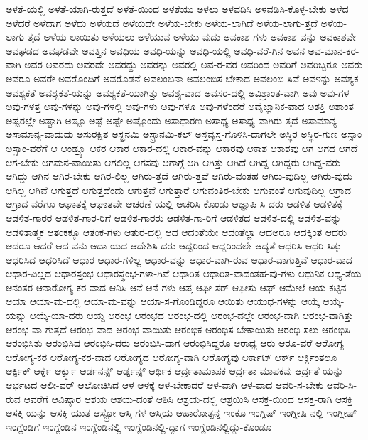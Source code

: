 {ಅಳತೆ-ಯಲ್ಲಿ
ಅಳತೆ-ಯಾಗಿ-ರುತ್ತದೆ
ಅಳತೆ-ಯಿಂದ
ಅಳತೆಯು
ಅಳಲು
ಅಳವಡಿಸಿ
ಅಳವಡಿಸಿ-ಕೊಳ್ಳ-ಬೇಕು
ಅಳೆದ
ಅಳೆದರೆ
ಅಳೆದಾಗ
ಅಳೆದು
ಅಳೆಯದೆ
ಅಳೆಯದೇ
ಅಳೆಯ-ಬೇಕು
ಅಳೆಯ-ಲಾಗಿದೆ
ಅಳೆಯ-ಲಾಗು-ತ್ತದೆ
ಅಳೆಯ-ಲಾಗು-ತ್ತದೆ
ಅಳೆಯ-ಲಾಯಿತು
ಅಳೆಯಲು
ಅಳೆಯುವ
ಅಳೆಯು-ವುದು
ಅವಕಾಶ-ಗಳು
ಅವಕಾಶ-ವನ್ನು
ಅವಕಾಶವೇ
ಅವಘಡದ
ಅವಘಡವೇ
ಅವತ್ತಿನ
ಅವಧಿಯ
ಅವಧಿ-ಯನ್ನು
ಅವಧಿ-ಯಲ್ಲಿ
ಅವಧಿ-ವರೆ-ಗಿನ
ಅವನ
ಅವ-ಮಾನ-ಕರ-ವಾಗಿ
ಅವರ
ಅವರದು
ಅವರದೇ
ಅವರದ್ದು
ಅವರನ್ನು
ಅವರಲ್ಲಿ
ಅವ-ರ-ವರ
ಅವರಿಂದ
ಅವರಿಗೆ
ಅವರಿಬ್ಬರೂ
ಅವರು
ಅವರೂ
ಅವರೇ
ಅವರೊಂದಿಗೆ
ಅವರೊಡನೆ
ಅವಲಂಬನಾ
ಅವಲಂಬಿಸ-ಬೇಕಾದ
ಅವಲಂಬಿ-ಸಿವೆ
ಅವಳನ್ನು
ಅವಶ್ಯಕ
ಅವಶ್ಯಕತೆ
ಅವಶ್ಯಕತೆ-ಯನ್ನು
ಅವಶ್ಯಕತೆ-ಯಾಗಿತ್ತು
ಅವಶ್ಯ-ವಾದ
ಅವಸರ-ದಲ್ಲಿ
ಅವಿಶ್ರಾಂತ-ವಾಗಿ
ಅವು
ಅವು-ಗಳ
ಅವು-ಗಳತ್ತ
ಅವು-ಗಳನ್ನು
ಅವು-ಗಳಲ್ಲಿ
ಅವು-ಗಳು
ಅವು-ಗಳೂ
ಅವು-ಗಳೆಂದರೆ
ಅವೈಜ್ಞಾನಿಕ-ವಾದ
ಅಶಕ್ತಿ
ಅಶಾಂತ
ಅಷ್ಟರಲ್ಲೇ
ಅಷ್ಟಾಗಿ
ಅಷ್ಟೂ
ಅಷ್ಟೆ
ಅಷ್ಟೇ
ಅಷ್ಟೊಂದು
ಅಸಾಧಾರಣ
ಅಸಾಧ್ಯ
ಅಸಾಧ್ಯ-ವಾಗಿರು-ತ್ತದೆ
ಅಸಾಮಾನ್ಯ
ಅಸಾಮಾನ್ಯ-ವಾದುದು
ಅಸುರಕ್ಷಿತ
ಅಸ್ಟ್ರನಮಿ
ಅಸ್ಟ್ರಾನಮಿ-ಕಲ್
ಅಸ್ತವ್ಯಸ್ತ-ಗೊಳಿಸಿ-ದಾಗಲೇ
ಅಸ್ಥಿರ
ಅಸ್ಥಿರ-ಗುಣ
ಅಸ್ಸಾಂ
ಅಸ್ಸಾಂ-ವರೆಗೆ
ಆ
ಆಂಡ್ರ್ಯೂ
ಆಕರ
ಆಕಾರ
ಆಕಾರ-ದಲ್ಲಿ
ಆಕಾರ-ವನ್ನು
ಆಕಾರವು
ಆಕಾಶ
ಆಕಾಶವು
ಆಗ
ಆಗದ
ಆಗದೆ
ಆಗ-ಬೇಕು
ಆಗಮನ-ವಾಯಿತು
ಆಗಲಿಲ್ಲ
ಆಗಸವು
ಆಗಾಗ್ಗೆ
ಆಗಿ
ಆಗಿತ್ತು
ಆಗಿದೆ
ಆಗಿದ್ದ
ಆಗಿದ್ದರು
ಆಗಿದ್ದ-ವರು
ಆಗಿದ್ದು
ಆಗಿನ
ಆಗಿರ-ಬೇಕು
ಆಗಿರ-ಲಿಲ್ಲ
ಆಗಿರು-ತ್ತದೆ
ಆಗಿರು-ತ್ತವೆ
ಆಗಿರು-ವಂತಹ
ಆಗಿರು-ವುದಿಲ್ಲ
ಆಗಿರು-ವುದು
ಆಗಿಲ್ಲ
ಆಗಿವೆ
ಆಗುತ್ತದೆ
ಆಗುತ್ತದೆಂದು
ಆಗುತ್ತವೆ
ಆಗುತ್ತಾರೆ
ಆಗುವಂತಿರ-ಬೇಕು
ಆಗುವಂತೆ
ಆಗುವುದಿಲ್ಲ
ಆಗ್ರಾದ
ಆಗ್ರಾದ-ವರೆಗೂ
ಆಘಾತಕ್ಕೆ
ಆಘಾತವೇ
ಆಚರಣೆ-ಯಲ್ಲಿ
ಆಚರಿಸಿ-ಕೊಂಡು
ಆಜ್ಞಾಪಿ-ಸಿ-ದರು
ಆಡಳಿತ
ಆಡಳಿತಕ್ಕೆ
ಆಡಳಿತ-ಗಾರರ
ಆಡಳಿತ-ಗಾರ-ರಿಗೆ
ಆಡಳಿತ-ಗಾರರು
ಆಡಳಿತ-ಗಾ-ರಿಗೆ
ಆಡಳಿತದ
ಆಡಳಿತ-ದಲ್ಲಿ
ಆಡಳಿತ-ವನ್ನು
ಆಡಳಿತಾತ್ಮಕ
ಆತಂಕಕ್ಕೂ
ಆತಂಕ-ಗಳು
ಆತುರ-ದಲ್ಲಿ
ಆದ
ಆದಂತೆಯೇ
ಆದಂತೆಲ್ಲಾ
ಆದಅರೂ
ಆದಕ್ಕಿಂತ
ಆದರು
ಆದರೂ
ಆದರೆ
ಆದ-ವನು
ಆದಾ-ಯದ
ಆದೇಶಿಸಿ-ದರು
ಆದ್ದರಿಂದ
ಆದ್ದರಿಂದಲೇ
ಆದ್ಯತೆ
ಆಧರಿಸಿ
ಆಧರಿ-ಸಿತ್ತು
ಆಧರಿಸಿದ
ಆಧರಿಸಿದೆ
ಆಧಾರ
ಆಧಾರ-ಗಳಿಲ್ಲ
ಆಧಾರ-ವನ್ನು
ಆಧಾರ-ವಾಗಿ-ರುವ
ಆಧಾರ-ವಾಗುತ್ತಿವೆ
ಆಧಾರ-ವಾದ
ಆಧಾರ-ವಿಲ್ಲದ
ಆಧಾರಸ್ತಂಭ
ಆಧಾರಸ್ಥಂಭ-ಗಳಾ-ಗಿವೆ
ಆಧಾರಿತ
ಆಧಾರಿತ-ವಾದಂತಹ-ವು-ಗಳು
ಆಧುನಿಕ
ಆಧ್ಯ-ತೆಯ
ಆನಂತರ
ಆನಾರೋಗ್ಯ-ಕರ-ವಾದ
ಆನಿಸಿ
ಆನೆ
ಆನೆ-ಗಳು
ಆಪ್ತ
ಆಫೀ-ಸರ್
ಆಫೀಸು
ಆಫ್
ಆಮೇಲೆ
ಆಯ-ಕಟ್ಟಿನ
ಆಯಾ
ಆಯಾ-ಮ-ದಲ್ಲಿ
ಆಯಾ-ಮ-ವನ್ನು
ಆಯಾ-ಸ-ಗೊಂಡಿದ್ದರೂ
ಆಯಿತು
ಆಯುಧ-ಗಳನ್ನು
ಆಯ್ಕೆ
ಆಯ್ಕೆ-ಯನ್ನು
ಆಯ್ಕೆ-ಯಾ-ದರು
ಆಯ್ದ
ಆರಂಭ
ಆರಂಭದ
ಆರಂಭ-ದಲ್ಲಿ
ಆರಂಭ-ದಲ್ಲೇ
ಆರಂಭ-ವಾಗಿ
ಆರಂಭ-ವಾಗಿತ್ತು
ಆರಂಭ-ವಾ-ಗುತ್ತದೆ
ಆರಂಭ-ವಾದ
ಆರಂಭ-ವಾಯಿತು
ಆರಂಭಿಕ
ಆರಂಭಿಸ-ಬೇಕಾಯಿತು
ಆರಂಭಿ-ಸಲು
ಆರಂಭಿಸಿ
ಆರಂಭಿಸಿತು
ಆರಂಭಿಸಿದ
ಆರಂಭಿಸಿ-ದರು
ಆರಂಭಿಸಿ-ದಾಗ
ಆರಂಭಿಸಿದ್ದರೂ
ಆರಾಧ್ಯ
ಆರು
ಆರೂ-ವರೆ
ಆರೋಗ್ಯ
ಆರೋಗ್ಯ-ಕರ
ಆರೋಗ್ಯ-ಕರ-ವಾದ
ಆರೋಗ್ಯದ
ಆರೋಗ್ಯ-ವಾಗಿ
ಆರೋಗ್ಯವು
ಆರ್ಕಾಟ್
ಆರ್ಕ್
ಆರ್ಕ್ಗಿಂತಲೂ
ಆರ್ಕ್ಟಿಕ್
ಆರ್ಕ್ನ
ಆರ್ಕ್ನ್ನು
ಆರ್ಡನನ್ಸ್
ಆರ್ಡ್ನನ್ಸ್
ಆರ್ಥಿಕ
ಆರ್ದ್ರತಾಮಾಪಕ
ಆರ್ದ್ರತಾ-ಮಾಪಕವು
ಆರ್ದ್ರತೆ-ಯನ್ನು
ಆರ್ಭಟದ
ಆಲೀ-ವರ್
ಆಲೋಚಿಸಿದ
ಆಳ
ಆಳಕ್ಕೆ
ಆಳ-ಬೇಕಾದರೆ
ಆಳ-ವಾಗಿ
ಆಳ-ವಾದ
ಆವರಿ-ಸ-ಬೇಕು
ಆವರಿ-ಸಿ-ರುವ
ಆವರೆಗೆ
ಆವಿಷ್ಕಾರ
ಆಶಯ
ಆಶಯ-ದಂತೆ
ಆಶಿಸಿ
ಆಶ್ರಯ-ದಲ್ಲಿ
ಆಶ್ರಯಿಸಿ
ಆಸಕ್ತ-ಯಿಂದ
ಆಸಕ್ತ-ರಾಗಿ
ಆಸಕ್ತಿ
ಆಸಕ್ತಿ-ಯನ್ನು
ಆಸಕ್ತಿ-ಯುತ
ಆಸ್ಟ್ರೋ
ಆಸ್ತಿ-ಗಳ
ಆಸ್ತಿಯ
ಆಹಾರೋತ್ಪನ್ನ
ಇಂಕೂ
ಇಂಗ್ಲಿಷ್
ಇಂಗ್ಲೀಷಿ-ನಲ್ಲಿ
ಇಂಗ್ಲೀಷ್
ಇಂಗ್ಲೆಂಡಿಗೆ
ಇಂಗ್ಲೆಂಡಿನ
ಇಂಗ್ಲೆಂಡಿನಲ್ಲಿ
ಇಂಗ್ಲೆಂಡಿನಲ್ಲಿ-ದ್ದಾಗ
ಇಂಗ್ಲೆಂಡಿನಲ್ಲಿದ್ದು-ಕೊಂಡೂ
}
